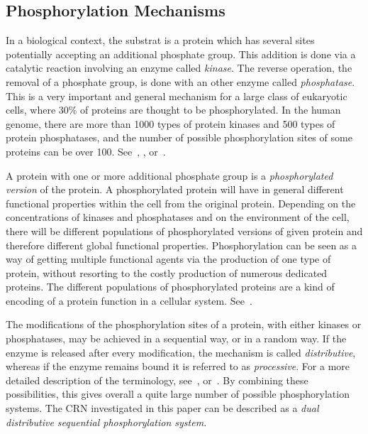 \documentclass[english]{amsart}
\numberwithin{proposition}{section}
\begin{document}
\subsection{Phosphorylation Mechanisms}\label{PhosphoSec}
In a biological context, the substrat is a protein which has several sites potentially accepting an additional phosphate group. This addition is done via a catalytic reaction involving  an enzyme called {\em kinase}. The reverse operation, the removal of a phosphate group, is done with an other enzyme called {\em phosphatase}. This is a very important and general mechanism for a large class of eukaryotic cells, where 30\% of proteins are thought to be phosphorylated. In the human genome, there are more than 1000  types of protein kinases and 500  types of protein phosphatases, and the number of possible phosphorylation sites of some proteins can be over 100. See~\citet{Krebs1993}, \citet{Cohen2000}, or~\citet{Thomson2009}.

A protein with one or more additional phosphate group is a {\em phosphorylated version} of the protein. A phosphorylated protein will have in general different functional properties within the cell from the original protein.  Depending on the concentrations of kinases and phosphatases and on the environment of the cell,  there will be  different populations of phosphorylated versions of given protein and therefore different global functional properties.  Phosphorylation can be seen as a way of getting multiple functional agents via the production of one type of protein, without resorting to the costly production of numerous dedicated proteins. The different populations of phosphorylated proteins are a kind of  encoding of a protein function in a cellular system. See~\citet{Gunawardena2005}. 

The modifications of the phosphorylation sites of a protein, with either kinases or phosphatases,  may be achieved in a sequential way,  or in a random way. If the enzyme
is released after every modification, the mechanism is called {\em distributive}, whereas if the enzyme remains bound it is referred
to as {\em processive}. For a more detailed description of the terminology, see~\citet{Suwanmajo}, \citet{Salazar2009} or~\citet{Conradi2018}.  By combining these possibilities, this gives overall a quite large number of possible phosphorylation systems.  The CRN investigated in this paper can be described as a {\em dual distributive sequential phosphorylation system}. 
\end{document}
